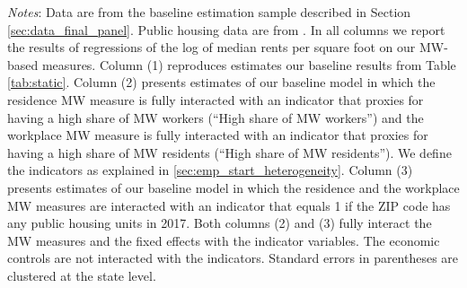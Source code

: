 \begin{table}[hbt!]
    \begin{minipage}{.95\textwidth} \footnotesize
        \vspace{2mm}
        \textit{Notes}: 
        Data are from the baseline estimation sample described in Section 
        \ref{sec:data_final_panel}.
        Public housing data are from \textcite{hudHousing}.
        In all columns we report the results of regressions of the log of median rents 
        per square foot on our MW-based measures.
        Column (1) reproduces estimates our baseline results from Table \ref{tab:static}.
        Column (2) presents estimates of our baseline model in which the residence MW 
        measure is fully interacted with an indicator that proxies for having a high share 
        of MW workers (``High share of MW workers'') and the workplace MW measure is 
        fully interacted with an indicator that proxies for having a high share of MW 
        residents (``High share of MW residents'').
        We define the indicators as explained in \ref{sec:emp_start_heterogeneity}.
        Column (3) presents estimates of our baseline model in which the residence and 
        the workplace MW measures are interacted with an indicator that equals 1 if 
        the ZIP code has any public housing units in 2017.
        Both columns (2) and (3) fully interact the MW measures and the fixed effects
        with the indicator variables. The economic controls are not interacted with 
        the indicators.
        Standard errors in parentheses are clustered at the state level.
    \end{minipage}
\end{table}
